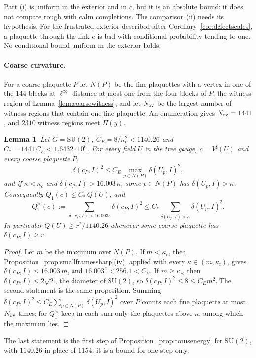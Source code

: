 \documentclass[11pt]{amsart}
\newtheorem{lemma}[theorem]{Lemma}
\theoremstyle{definition}
\theoremstyle{remark}
\numberwithin{equation}{section}
\newcommand{\SU}{\mathrm{SU}}
\begin{document}
Part (i) is uniform in the exterior and in $c$, but it is an absolute
bound: it does not compare rough with calm completions. The comparison (ii)
needs its hypothesis. For the frustrated exterior described after
Corollary~\ref{cor:defectscales}, a plaquette through the link $e$ is bad
with conditional probability tending to one. No conditional bound uniform in
the exterior holds.

\paragraph*{Coarse curvature.}
For a coarse plaquette $P$ let $N(P)$ be the fine plaquettes with a vertex in
one of the $144$ blocks at $\ell^\infty$ distance at most one from the four
blocks of $P$, the witness region of Lemma~\ref{lem:coarsewitness}, and let
$N_{\rm ov}$ be the largest number of witness regions that contain one fine
plaquette. An enumeration gives $N_{\rm ov}=1441$, and $2310$ witness
regions meet $\Pi(y)$.

\begin{lemma}\label{lem:lfcoarseenergy}
Let $G=\SU(2)$, $C_E=8/\kappa_c^2<1140.26$ and $C_*=1441\,C_E<1.6432\cdot
10^6$. For every field $U$ in the tree gauge, $c=V^\sharp(U)$ and every
coarse plaquette $P$,
\[
\delta(c_P,I)^2\le C_E\max_{p\in N(P)}\delta(U_p,I)^2 ,
\]
and if $\kappa<\kappa_c$ and $\delta(c_P,I)>16.003\,\kappa$, some $p\in N(P)$
has $\delta(U_p,I)>\kappa$. Consequently $Q_1(c)\le C_*\,Q(U)$, and
\[
Q_1^{>}(c):=\sum_{\delta(c_P,I)>16.003\kappa}\delta(c_P,I)^2\le C_*
\sum_{\delta(U_p,I)>\kappa}\delta(U_p,I)^2 .
\]
In particular $Q(U)\ge r^2/1140.26$ whenever some coarse plaquette has
$\delta(c_P,I)\ge r$.
\end{lemma}

\begin{proof}
Let $m$ be the maximum over $N(P)$. If $m<\kappa_c$, then
Proposition~\ref{prop:smallframessharp}(iv), applied with every $\kappa\in
(m,\kappa_c)$, gives $\delta(c_P,I)\le16.003\,m$, and $16.003^2<256.1<C_E$.
If $m\ge\kappa_c$, then $\delta(c_P,I)\le2\sqrt2$, the diameter of
$\SU(2)$, so $\delta(c_P,I)^2\le8\le C_Em^2$. The second statement is the
same proposition. Summing $\delta(c_P,I)^2\le C_E\sum_{p\in N(P)}\delta(U_p,
I)^2$ over $P$ counts each fine plaquette at most $N_{\rm ov}$ times; for
$Q_1^{>}$ keep in each sum only the plaquettes above $\kappa$, among which
the maximum lies.
\end{proof}

The last statement is the first step of Proposition~\ref{prop:torusenergy}
for $\SU(2)$, with $1140.26$ in place of $1154$; it is a bound for one step
only.
\end{document}
